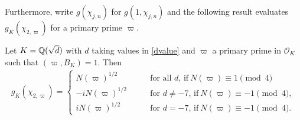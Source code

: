 \documentclass[twoside,leqno,10pt, A4]{amsart}
\begin{document}
Furthermore, write $g(\chi_{j,n})$ for $g(1, \chi_{j,n})$ and the following result evaluates $g_K(\chi_{2,\varpi})$  for a primary prime $\varpi$.
\begin{lemma}
\label{Gausssum}
    Let $K=\mathbb Q(\sqrt{d})$ with $d$ taking values in \eqref{dvalue} and $\varpi$ a primary prime in $\mathcal{O}_K$ such that $(\varpi, B_K)=1$. Then
\begin{align}
\label{gvalue}
   g_K(\chi_{2,\varpi})= \begin{cases}
    N(\varpi)^{1/2} \qquad & \text{for all $d$, if} \ N(\varpi) \equiv 1 \pmod 4 \\
    -i N(\varpi)^{1/2} \qquad & \text{for $d \neq -7$, if} \  N(\varpi) \equiv -1 \pmod 4,\\
     i N(\varpi)^{1/2} \qquad & \text{for $d = -7$, if} \ N(\varpi) \equiv -1 \pmod 4.
\end{cases}
\end{align}
\end{lemma}
\end{document}
